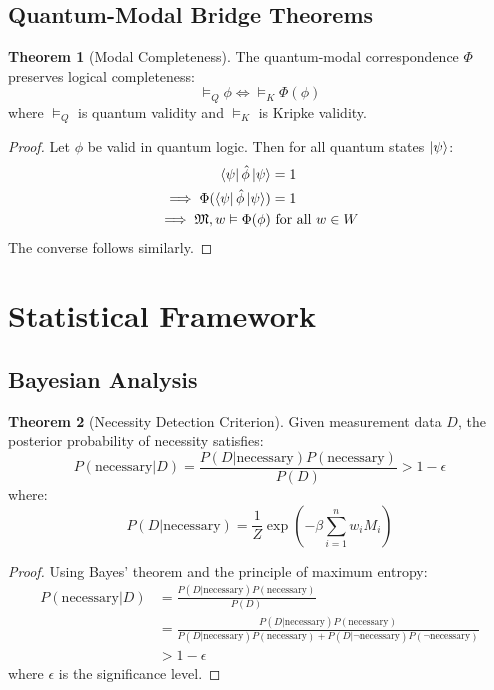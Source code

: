 \documentclass[12pt]{article}
\theoremstyle{definition}
\newtheorem{theorem}{Theorem}[section]
\begin{document}
\subsection{Quantum-Modal Bridge Theorems}

\begin{theorem}[Modal Completeness]
The quantum-modal correspondence $\Phi$ preserves logical completeness:
\begin{equation}
    \vDash_Q \phi \iff \vDash_K \Phi(\phi)
\end{equation}
where $\vDash_Q$ is quantum validity and $\vDash_K$ is Kripke validity.
\end{theorem}

\begin{proof}
Let $\phi$ be valid in quantum logic. Then for all quantum states $\ket{\psi}$:
\begin{align}
    \bra{\psi}\hat{\phi}\ket{\psi} &= 1 \\
    \implies \Phi(\bra{\psi}\hat{\phi}\ket{\psi}) &= 1 \\
    \implies \mathfrak{M}, w \vDash \Phi(\phi) &\text{ for all } w \in W
\end{align}
The converse follows similarly.
\end{proof}

\section{Statistical Framework}

\subsection{Bayesian Analysis}

\begin{theorem}[Necessity Detection Criterion]
Given measurement data $D$, the posterior probability of necessity satisfies:
\begin{equation}
    P(\text{necessary}|D) = \frac{P(D|\text{necessary})P(\text{necessary})}{P(D)} > 1 - \epsilon
\end{equation}
where:
\begin{equation}
    P(D|\text{necessary}) = \frac{1}{Z}\exp\left(-\beta\sum_{i=1}^n w_iM_i\right)
\end{equation}
\end{theorem}

\begin{proof}
Using Bayes' theorem and the principle of maximum entropy:
\begin{align}
    P(\text{necessary}|D) &= \frac{P(D|\text{necessary})P(\text{necessary})}{P(D)} \\
    &= \frac{P(D|\text{necessary})P(\text{necessary})}{P(D|\text{necessary})P(\text{necessary}) + P(D|\neg\text{necessary})P(\neg\text{necessary})} \\
    &> 1 - \epsilon
\end{align}
where $\epsilon$ is the significance level.
\end{proof}
\end{document}
